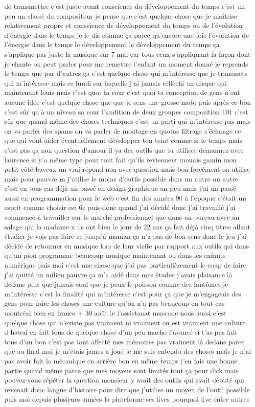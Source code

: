 de transmettre c'est juste avant conscience du développement du temps c'est un peu un classé du compositeur je pense que c'est quelque chose que je maîtrise relativement propre et conscience de développement du temps ou de l'évolution d'énergie dans le temps je le dis comme ça parce qu'encore une fois l'évolution de l'énergie dans le temps le développement le développement du temps ça s'applique pas juste la musique sur 7 mai car tous ceux s'appliquant la façon dont je chante on peut parler pour me remettre l'enfant un moment donné je reprends le temps que par d'autres ça c'est quelque chose qui m'intéresse que je transmets qui m'intéresse mais ce lundi sur laquelle j'ai jamais réfléchi un disque qui maintenant louis mais c'est quoi ta cour c'est quoi ta conception de gens n'ont aucune idée c'est quelque chose que que je sens une grosse moto puis après ce bon c'est sûr qu'à un niveau sa cour l'audition de deux groupes composition 101 c'est sûr que quand même des choses techniques c'est un parti qui m'intéresse pas mais on va parler des spams on va parler de montage en quotas filtrage s'échange ce que qui vont aider éventuellement développer ton teint comme si le temps mais c'est pas ça non question d'amour il ya des outils que tu utilises demannez avec laurence si y'a même type pour tout fait qu'ils reviennent mouais gamin mon petit côté baveux un vrai répond non avec question mais bon forcément on utilise mais pour pauvre m j'utilise le moins d'outils possible dans un autre un autre c'est en tous cas déjà un passé en design graphique un peu mais j'ai un passé aussi en programmation pour le web c'est fin des années 90 à l'époque c'était un esprit comme choisir est 6e puis donc quand j'ai décidé donc j'ai travaillé j'ai commencé à travailler sur le marché professionnel que dans un bureau avec un salage qui la madame x ils ont bien le jour de 22 ans ça fait déjà cinq titres allant étudier je vois pas faire ce jusqu'à maman ça n'a pas de bon sens donc le jeu j'ai décidé de retourner en musique lors de leur visite par rapport aux outils qui dans qu'un pion programme beaucoup musique maintenant ou dans les enfants numérique puis moi c'est une chose que j'ai pas particulièrement le coup de faire j'ai quitté un milieu pauvre ça m'a aidé dans mes études j'avais plaisance là dedans plus que jamais sauf que je peux le poisson comme des fantômes je m'intéresse c'est la finalité qui m'intéresse c'est pour ça que je m'engageais des gens pour faire les choses une culture qu'on n'a pas beaucoup en tout cas montréal bien en france + 30 août le l'assistanat muscade nous aussi c'est quelque chose qui n'existe pas vraiment ni vraiment on est vraiment une culture d hawaï en fait tous de quelque chose d'un peu macho l'avancé si t'as pas fait tous d'un bon c'est pas tant affecté mes mémoires pas vraiment là dedans parce que au final moi je m'étais james a joué je me suis entendu des choses mais je n'ai pas avoir fait la mécanique en arrière bon en même temps j'en fais une bonne partie quand même parce que mes moyens sont limités tout ça pour dick mais pouvez-vous répéter la question monsieur y avait des outils qui avait débuté qui revenait donc langue d'histoire pour dire que j'utilise un moyen de l'outil possible puis moi depuis plusieurs années la plateforme ses lives pourquoi live entre autres 